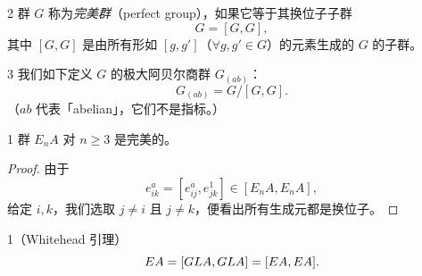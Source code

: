 \begin{defn}{2}
群 $G$ 称为\emph{完美群}（perfect group），如果它等于其换位子子群
\[
  G = [G,G],
\]
其中 $[G,G]$ 是由所有形如 $[g,g']$（$\forall g,g'\in G$）的元素生成的 $G$ 的子群。
\end{defn}

\begin{defn}{3}
我们如下定义 $G$ 的极大阿贝尔商群 $G_{(ab)}$：
\[
  G_{(ab)} = G/[G,G].
\]
（$ab$ 代表「abelian」，它们不是指标。）
\end{defn}

\begin{prop}{1}
群 $E_nA$ 对 $n\ge 3$ 是完美的。
\end{prop}

\begin{proof}
由于
\[
  e_{ik}^a = [e_{ij}^a, e_{jk}^1] \in [E_nA, E_nA],
\]
给定 $i,k$，我们选取 $j\ne i$ 且 $j\ne k$，便看出所有生成元都是换位子。
\end{proof}

\begin{lem}{1}（Whitehead 引理）
\[
  EA = [GL A,GL A] = [EA,EA].
\]
\end{lem}


